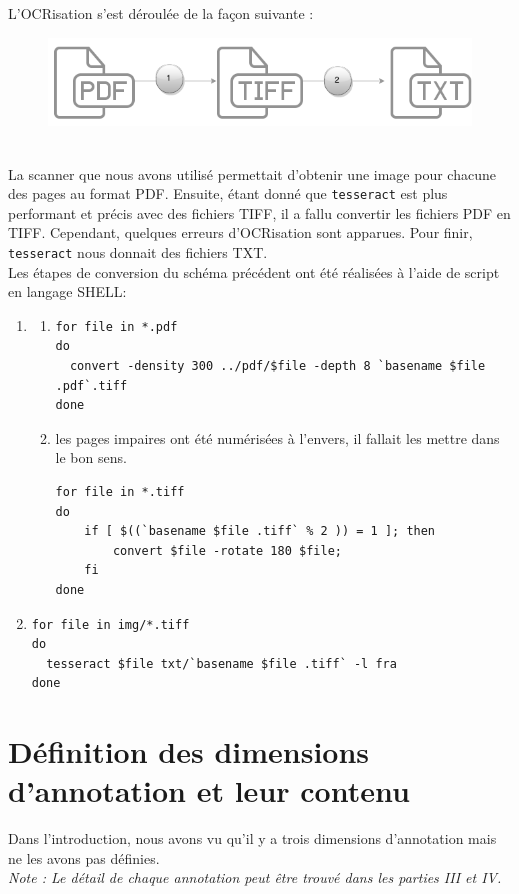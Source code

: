 \documentclass[a4paper, 11pt]{report}
\begin{document}
    L'OCRisation s'est déroulée de la façon suivante : 
    \begin{figure}[h]
    \centering
    \includegraphics[scale=.3]{img/OCRisation.png}
    \end{figure}\\
    La scanner que nous avons utilisé permettait d'obtenir une image pour chacune des pages au format PDF. Ensuite, étant donné que  \texttt{tesseract} est plus performant et précis avec des fichiers TIFF, il a fallu convertir les fichiers PDF en TIFF. Cependant, quelques erreurs d'OCRisation sont apparues. Pour finir,  \texttt{tesseract} nous donnait des fichiers TXT.\\
    Les étapes de conversion du schéma précédent ont été réalisées à l'aide de script en langage SHELL:
    \begin{enumerate}
        \item \begin{enumerate}
    	      \item	
           \begin{verbatim}
for file in *.pdf
do
  convert -density 300 ../pdf/$file -depth 8 `basename $file .pdf`.tiff
done
           \end{verbatim}
          \item les pages impaires ont été numérisées à l'envers, il fallait les mettre dans le bon sens.
          \begin{verbatim}
for file in *.tiff
do
    if [ $((`basename $file .tiff` % 2 )) = 1 ]; then
        convert $file -rotate 180 $file;
    fi
done
          \end{verbatim}
       \end{enumerate}
    \item 
    \begin{verbatim}
for file in img/*.tiff
do
  tesseract $file txt/`basename $file .tiff` -l fra
done 
    \end{verbatim}
    \end{enumerate}
    
	\section{Définition des dimensions d'annotation et leur contenu}
    Dans l'introduction, nous avons vu qu'il y a trois dimensions d'annotation mais ne les avons pas définies.\\
	\textit{Note : Le détail de chaque annotation peut être trouvé dans les parties III et IV.}
\end{document}
